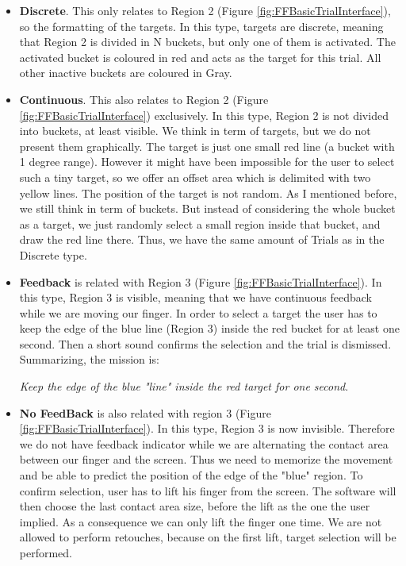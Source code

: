 \begin{itemize}
	\item \textbf{Discrete}. This only relates to Region 2 (Figure \ref{fig:FFBasicTrialInterface}), so the formatting of the targets. In this type, targets are discrete, meaning that Region 2 is divided in N buckets, but only one of them is activated. The activated bucket is coloured in red and acts as the target for this trial. All other inactive buckets are coloured in Gray. 

	\item \textbf{Continuous}. This also relates to Region 2 (Figure \ref{fig:FFBasicTrialInterface}) exclusively. In this type, Region 2 is not divided into buckets, at least visible. We think in term of targets, but we do not present them graphically. The target is just one small red line (a bucket with 1 degree range). However it might have been impossible for the user to select such a tiny target, so we offer an offset area which is delimited with two yellow lines. The position of the target is not random. As I mentioned before, we still think in term of buckets. But instead of considering the whole bucket as a target, we just randomly select a small region inside that bucket, and draw the red line there. Thus, we have the same amount of Trials as in the Discrete type.

	\item \textbf{Feedback} is related with Region 3 (Figure \ref{fig:FFBasicTrialInterface}). In this type, Region 3 is visible, meaning that we have continuous feedback while we are moving our finger. In order to select a target the user has to keep the edge of the blue line (Region 3) inside the red bucket for at least one second. Then a short sound confirms the selection and the trial is dismissed. Summarizing, the mission is: 

	\emph{Keep the edge of the blue "line" inside the red target for one second}.

	\item \textbf{No FeedBack} is also related with region 3 (Figure \ref{fig:FFBasicTrialInterface}). In this type, Region 3 is now invisible. Therefore we do not have feedback indicator while we are alternating the contact area between our finger and the screen. Thus we need to memorize the movement and be able to predict the position of the edge of the "blue" region. To confirm selection, user has to lift his finger from the screen. The software will then choose the last contact area size,  before the lift as the one the user implied. As a consequence we can only lift the finger one time. We are not allowed to perform retouches, because on the first lift, target selection will be performed. 


\end{itemize}
